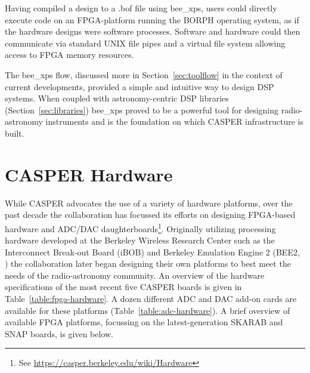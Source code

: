 \documentclass{ws-jai}
\begin{document}
Having compiled a design to a .bof file using bee\_xps, users could directly execute code on an FPGA-platform running the BORPH operating system, as if the hardware designs were software processes. Software and hardware could then communicate via standard UNIX file pipes and a virtual file system allowing access to FPGA memory resources.

The bee\_xps flow, discussed more in Section~\ref{sec:toolflow} in the context of current developments, provided a simple and intuitive way to design DSP systems. When coupled with astronomy-centric DSP libraries (Section~\ref{sec:libraries}) bee\_xps proved to be a powerful tool for designing radio-astronomy instruments and is the foundation on which CASPER infrastructure is built.

\section{CASPER Hardware} \label{sec:Hardware}

While CASPER advocates the use of a variety of hardware platforms, over the past decade the collaboration has focussed its efforts on designing FPGA-based hardware and ADC/DAC daughterboards\footnote{See \url{https://casper.berkeley.edu/wiki/Hardware}}. Originally utilizing processing hardware developed at the Berkeley Wireless Research Center such as the Interconnect Break-out Board (iBOB) and Berkeley Emulation Engine 2 (BEE2, \citet{bee2}) the collaboration later began designing their own platforms to best meet the needs of the radio-astronomy community. An overview of the hardware specifications of the most recent five CASPER boards is given in Table~\ref{table:fpga-hardware}. A dozen different ADC and DAC add-on cards are available for these platforms (Table~\ref{table:adc-hardware}). A brief overview of available FPGA platforms, focussing on the latest-generation SKARAB and SNAP boards, is given below.
\end{document}
